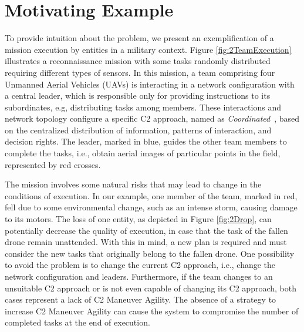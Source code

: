 \section{Motivating Example}
\label{sec:motivation}

To provide intuition about the problem, we present an exemplification of a mission execution by entities in a military context. Figure \ref{fig:2TeamExecution} illustrates a reconnaissance mission with some tasks randomly distributed requiring different types of sensors. In this mission, a team comprising four Unmanned Aerial Vehicles (UAVs) is interacting in a network configuration with a central leader, which is responsible only for providing instructions to its subordinates, e.g, distributing tasks among members. These interactions and network topology configure a specific C2 approach, named as \textit{Coordinated}~\citep{france2014}, based on the centralized distribution of information, patterns of interaction, and decision rights. The leader, marked in blue, guides the other team members to complete the tasks, i.e., obtain aerial images of particular points in the field, represented by red crosses.

The mission involves some natural risks that may lead to change in the conditions of execution. In our example, one member of the team, marked in red, fell due to some environmental change, such as an intense storm, causing damage to its motors. The loss of one entity, as depicted in Figure \ref{fig:2Drop}, can potentially decrease the quality of execution, in case that the task of the fallen drone remain unattended. With this in mind, a new plan is required and must consider the new tasks that originally belong to the fallen drone. One possibility to avoid the problem is to change the current C2 approach, i.e., change the network configuration and leaders. Furthermore, if the team changes to an unsuitable C2 approach or is not even capable of changing its C2 approach, both cases represent a lack of C2 Maneuver Agility. The absence of a strategy to increase C2 Maneuver Agility can cause the system to compromise the number of completed tasks at the end of execution. 

\begin{figure}
\centering
{}%
\end{figure}

